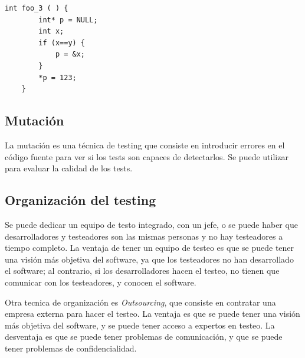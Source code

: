 \begin{lstlisting}[caption={Con 1 test donde \lstinline|x==y| se cubre todo el codigo, pero no todas las decisiones. En efecto, el defecto ocurre cuando \lstinline|x!=y|}]
	int foo_3 ( ) {
		int* p = NULL;
		int x;
		if (x==y) {
			p = &x;
		}
		*p = 123;
	}
\end{lstlisting}

\subsection{Mutación}

La mutación es una técnica de testing que consiste en introducir errores en el código fuente para ver si los tests son capaces de detectarlos. Se puede utilizar para evaluar la calidad de los tests.

\subsection{Organización del testing}
Se puede dedicar un equipo de testo integrado, con un jefe, o se puede haber que desarrolladores y testeadores son las mismas personas y no hay testeadores a tiempo completo.
La ventaja de tener un equipo de testeo es que se puede tener una visión más objetiva del software, ya que los testeadores no han desarrollado el software; al contrario, si los desarrolladores hacen el testeo, no tienen que comunicar con los testeadores, y conocen el software.

Otra tecnica de organización es \textit{Outsourcing}, que consiste en contratar una empresa externa para hacer el testeo. La ventaja es que se puede tener una visión más objetiva del software, y se puede tener acceso a expertos en testeo. La desventaja es que se puede tener problemas de comunicación, y que se puede tener problemas de confidencialidad.

